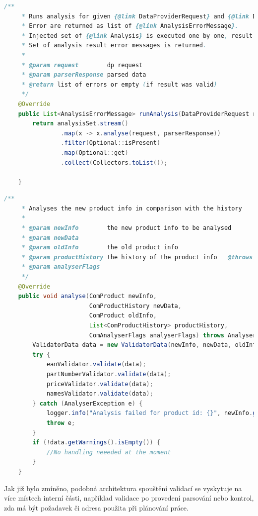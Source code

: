 \documentclass[thesis=B,czech]{FITthesis}[2012/06/26]
\begin{document}
\begin{lstlisting}[language=Java, caption={Upravená implementace hlavní metody ve třídě zajišťující spouštění validací analyzátoru}]
    /**
     * Runs analysis for given {@link DataProviderRequest} and {@link DPParserResponse}.
     * Error are returned as list of {@link AnalysisErrorMessage}.
     * Injected set of {@link Analysis} is executed one by one, result unwrapped and kept if present.
     * Set of analysis result error messages is returned.
     *
     * @param request        dp request
     * @param parserResponse parsed data
     * @return list of errors or empty (if result was valid)
     */
    @Override
    public List<AnalysisErrorMessage> runAnalysis(DataProviderRequest request, DPParserResponse parserResponse) {
        return analysisSet.stream()
                .map(x -> x.analyse(request, parserResponse))
                .filter(Optional::isPresent)
                .map(Optional::get)
                .collect(Collectors.toList());

    }
\end{lstlisting}
\par
\begin{lstlisting}[language=Java, caption={Původní implementace hlavní metody ve třídě zajišťující spouštění validací analyzátoru}]
    /**
     * Analyses the new product info in comparison with the history
     *
     * @param newInfo        the new product info to be analysed
     * @param newData
     * @param oldInfo        the old product info
     * @param productHistory the history of the product info   @throws AnalyserException when analysing fails, contains error type
     * @param analyserFlags
     */
    @Override
    public void analyse(ComProduct newInfo,
                        ComProductHistory newData,
                        ComProduct oldInfo,
                        List<ComProductHistory> productHistory,
                        ComAnalyserFlags analyserFlags) throws AnalyserException {
        ValidatorData data = new ValidatorData(newInfo, newData, oldInfo, productHistory, analyserFlags);
        try {
            eanValidator.validate(data);
            partNumberValidator.validate(data);
            priceValidator.validate(data);
            namesValidator.validate(data);
        } catch (AnalyserException e) {
            logger.info("Analysis failed for product id: {}", newInfo.getProductId(), e);
            throw e;
        }
        if (!data.getWarnings().isEmpty()) {
            //No handling neeeded at the moment
        }
    }
\end{lstlisting}
Jak již bylo zmíněno, podobná architektura spouštění validací se vyskytuje na více místech interní části, například validace po provedení
parsování nebo kontrol, zda má být požadavek či adresa použita při plánování práce.
\end{document}

